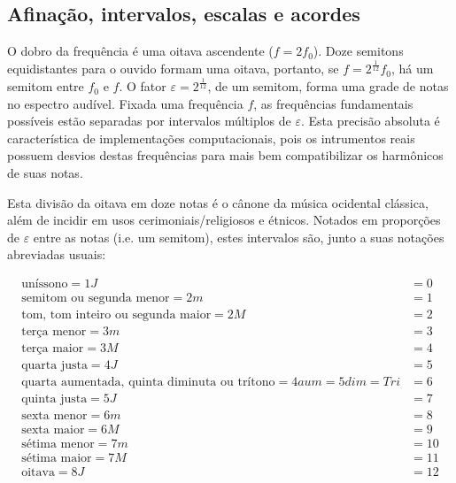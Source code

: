 \subsection{Afinação, intervalos, escalas e acordes}\label{subsec:intervalos}
O dobro da frequência é uma oitava ascendente ($f=2f_0$).
Doze semitons equidistantes para o ouvido formam uma oitava,
portanto, se $f=2^{\frac{1}{12}}f_0$, há um semitom entre $f_0$
e $f$.
O fator $\varepsilon=2^{\frac{1}{12}}$, de um semitom, forma uma grade de notas
no espectro audível. Fixada uma frequência $f$, as frequências fundamentais possíveis
estão separadas por intervalos múltiplos de $\varepsilon$.
Esta precisão absoluta é característica de implementações
computacionais, pois os intrumentos reais possuem desvios destas frequências para mais bem compatibilizar os harmônicos
de suas notas.\cite{Roederer}

Esta divisão da oitava em doze notas é o cânone da música ocidental clássica,
além de incidir em usos cerimoniais/religiosos e étnicos.\cite{Wisnick} Notados em proporções de $\varepsilon$ entre as notas (i.e. um semitom), estes intervalos são, junto a suas notações abreviadas usuais:

\begin{equation}\label{eq:intervalos}
\begin{split}
\text{uníssono} = 1J & = 0 \\
\text{semitom ou segunda menor} =2m & = 1 \\
\text{tom, tom inteiro ou segunda maior} =2M & = 2 \\
\text{terça menor} = 3m & = 3 \\
\text{terça maior} = 3M & = 4 \\
\text{quarta justa} = 4J & = 5 \\
\text{quarta aumentada, quinta diminuta ou trítono} = 4aum = 5dim = Tri & = 6 \\
\text{quinta justa} = 5J & = 7 \\
\text{sexta menor} = 6m & = 8 \\
\text{sexta maior} = 6M & = 9 \\
\text{sétima menor} = 7m & = 10 \\
\text{sétima maior} = 7M & = 11 \\
\text{oitava} = 8J & = 12
\end{split}
\end{equation}

